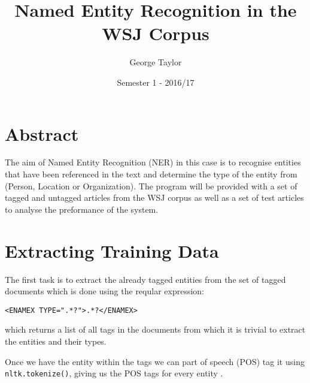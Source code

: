 \documentclass[draft]{article}
\title{Named Entity Recognition in the WSJ Corpus}
\author{George Taylor}
\date{Semester 1 - 2016/17}
\begin{document}
\nocite{*}


\maketitle
\begin{multicols*}{2}

\section*{Abstract}
The aim of Named Entity Recognition (NER) in this case is to recognise entities that have been referenced in the text and determine the type of the entity from (Person, Location or Organization). The program will be provided with a set of tagged and untagged articles from the WSJ corpus as well as a set of test articles to analyse the preformance of the system.

\section*{Extracting Training Data}
The first task is to extract the already tagged entities from the set of tagged documents which is done using the reqular expression: \begin{verbatim}<ENAMEX TYPE=".*?">.*?</ENAMEX>\end{verbatim} which returns a list of all tags in the documents from which it is trivial to extract the entities and their types.

Once we have the entity within the tags we can part of speech (POS) tag it using \texttt{nltk.tokenize()}, giving us the POS tags for every entity \citep{NLPChunker}.


\end{multicols*}
\end{document}

